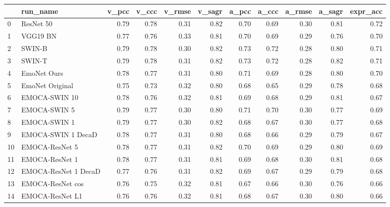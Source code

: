\begin{tabular}{llrrrrrrrrr}
\toprule
{} &                   run\_name &  v\_pcc &  v\_ccc &  v\_rmse &  v\_sagr &  a\_pcc &  a\_ccc &  a\_rmse &  a\_sagr &  expr\_acc \\
\midrule
0  &                  ResNet 50 &   0.79 &   0.78 &    0.31 &    0.82 &   0.70 &   0.69 &    0.30 &    0.81 &      0.72 \\
1  &                   VGG19 BN &   0.77 &   0.76 &    0.33 &    0.81 &   0.70 &   0.69 &    0.29 &    0.76 &      0.70 \\
2  &                     SWIN-B &   0.79 &   0.78 &    0.30 &    0.82 &   0.73 &   0.72 &    0.28 &    0.80 &      0.71 \\
3  &                     SWIN-T &   0.79 &   0.78 &    0.31 &    0.82 &   0.73 &   0.72 &    0.28 &    0.82 &      0.71 \\
4  &                EmoNet Ours &   0.78 &   0.77 &    0.31 &    0.80 &   0.71 &   0.69 &    0.28 &    0.80 &      0.70 \\
5  &            EmoNet Original &   0.75 &   0.73 &    0.32 &    0.80 &   0.68 &   0.65 &    0.29 &    0.78 &      0.68 \\
6  &              EMOCA-SWIN 10 &   0.78 &   0.76 &    0.32 &    0.81 &   0.69 &   0.68 &    0.29 &    0.81 &      0.67 \\
7  &               EMOCA-SWIN 5 &   0.79 &   0.77 &    0.30 &    0.80 &   0.71 &   0.70 &    0.30 &    0.77 &      0.69 \\
8  &               EMOCA-SWIN 1 &   0.79 &   0.77 &    0.30 &    0.82 &   0.68 &   0.67 &    0.30 &    0.77 &      0.68 \\
9  &         EMOCA-SWIN 1 DecaD &   0.78 &   0.77 &    0.31 &    0.80 &   0.68 &   0.66 &    0.29 &    0.79 &      0.67 \\
10 &             EMOCA-ResNet 5 &   0.78 &   0.77 &    0.31 &    0.82 &   0.70 &   0.69 &    0.29 &    0.80 &      0.69 \\
11 &             EMOCA-ResNet 1 &   0.78 &   0.77 &    0.31 &    0.81 &   0.69 &   0.68 &    0.30 &    0.81 &      0.68 \\
12 &       EMOCA-ResNet 1 DecaD &   0.77 &   0.76 &    0.31 &    0.82 &   0.69 &   0.67 &    0.29 &    0.79 &      0.68 \\
13 &           EMOCA-ResNet cos &   0.76 &   0.75 &    0.32 &    0.81 &   0.67 &   0.66 &    0.30 &    0.76 &      0.66 \\
14 &            EMOCA-ResNet L1 &   0.76 &   0.76 &    0.32 &    0.81 &   0.68 &   0.67 &    0.30 &    0.80 &      0.66 \\

\end{tabular}
